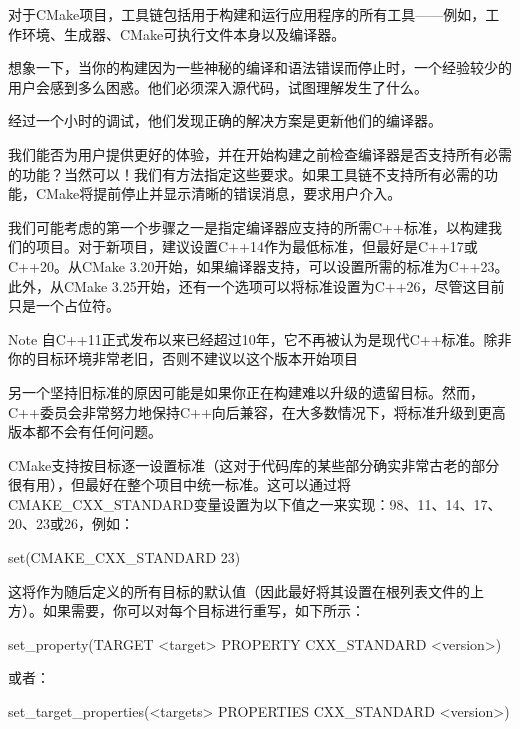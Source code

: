 对于CMake项目，工具链包括用于构建和运行应用程序的所有工具——例如，工作环境、生成器、CMake可执行文件本身以及编译器。

想象一下，当你的构建因为一些神秘的编译和语法错误而停止时，一个经验较少的用户会感到多么困惑。他们必须深入源代码，试图理解发生了什么。

经过一个小时的调试，他们发现正确的解决方案是更新他们的编译器。

我们能否为用户提供更好的体验，并在开始构建之前检查编译器是否支持所有必需的功能？当然可以！我们有方法指定这些要求。如果工具链不支持所有必需的功能，CMake将提前停止并显示清晰的错误消息，要求用户介入。


我们可能考虑的第一个步骤之一是指定编译器应支持的所需C++标准，以构建我们的项目。对于新项目，建议设置C++14作为最低标准，但最好是C++17或C++20。从CMake 3.20开始，如果编译器支持，可以设置所需的标准为C++23。此外，从CMake 3.25开始，还有一个选项可以将标准设置为C++26，尽管这目前只是一个占位符。

\begin{myNotic}{Note}
自C++11正式发布以来已经超过10年，它不再被认为是现代C++标准。除非你的目标环境非常老旧，否则不建议以这个版本开始项目
\end{myNotic}

另一个坚持旧标准的原因可能是如果你正在构建难以升级的遗留目标。然而，C++委员会非常努力地保持C++向后兼容，在大多数情况下，将标准升级到更高版本都不会有任何问题。

CMake支持按目标逐一设置标准（这对于代码库的某些部分确实非常古老的部分很有用），但最好在整个项目中统一标准。这可以通过将CMAKE\_CXX\_STANDARD变量设置为以下值之一来实现：98、11、14、17、20、23或26，例如：

\begin{cmake}
set(CMAKE_CXX_STANDARD 23)
\end{cmake}

这将作为随后定义的所有目标的默认值（因此最好将其设置在根列表文件的上方）。如果需要，你可以对每个目标进行重写，如下所示：

\begin{shell}
set_property(TARGET <target> PROPERTY CXX_STANDARD <version>)
\end{shell}

或者：

\begin{shell}
set_target_properties(<targets> PROPERTIES CXX_STANDARD <version>)
\end{shell}

